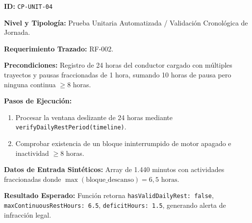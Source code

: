 \par\noindent\textbf{ID:} \texttt{C\allowbreak{}P\allowbreak{}-\allowbreak{}U\allowbreak{}N\allowbreak{}I\allowbreak{}T\allowbreak{}-\allowbreak{}0\allowbreak{}4\allowbreak{}}\par
\par\noindent\textbf{Nivel y Tipología:} Prueba Unitaria Automatizada / Validación Cronológica de Jornada.\par
\par\noindent\textbf{Requerimiento Trazado:} RF-002.\par
\par\noindent\textbf{Precondiciones:} Registro de 24 horas del conductor cargado con múltiples trayectos y pausas fraccionadas de 1 hora, sumando 10 horas de pausa pero ninguna continua \(\ge 8\) horas.\par
\par\noindent\textbf{Pasos de Ejecución:} \par
\begin{enumerate}
\item Procesar la ventana deslizante de 24 horas mediante \texttt{v\allowbreak{}e\allowbreak{}r\allowbreak{}i\allowbreak{}f\allowbreak{}y\allowbreak{}D\allowbreak{}a\allowbreak{}i\allowbreak{}l\allowbreak{}y\allowbreak{}R\allowbreak{}e\allowbreak{}s\allowbreak{}t\allowbreak{}P\allowbreak{}e\allowbreak{}r\allowbreak{}i\allowbreak{}o\allowbreak{}d\allowbreak{}(\allowbreak{}t\allowbreak{}i\allowbreak{}m\allowbreak{}e\allowbreak{}l\allowbreak{}i\allowbreak{}n\allowbreak{}e\allowbreak{})\allowbreak{}}.
\item Comprobar existencia de un bloque ininterrumpido de motor apagado e inactividad \(\ge 8\) horas.
\end{enumerate}
\par\noindent\textbf{Datos de Entrada Sintéticos:} Array de 1.440 minutos con actividades fraccionadas donde \(\max(\text{bloque\_descanso}) = 6{,}5\text{ horas}\).\par
\par\noindent\textbf{Resultado Esperado:} Función retorna \texttt{h\allowbreak{}a\allowbreak{}s\allowbreak{}V\allowbreak{}a\allowbreak{}l\allowbreak{}i\allowbreak{}d\allowbreak{}D\allowbreak{}a\allowbreak{}i\allowbreak{}l\allowbreak{}y\allowbreak{}R\allowbreak{}e\allowbreak{}s\allowbreak{}t\allowbreak{}:\allowbreak{} f\allowbreak{}a\allowbreak{}l\allowbreak{}s\allowbreak{}e\allowbreak{}}, \texttt{m\allowbreak{}a\allowbreak{}x\allowbreak{}C\allowbreak{}o\allowbreak{}n\allowbreak{}t\allowbreak{}i\allowbreak{}n\allowbreak{}u\allowbreak{}o\allowbreak{}u\allowbreak{}s\allowbreak{}R\allowbreak{}e\allowbreak{}s\allowbreak{}t\allowbreak{}H\allowbreak{}o\allowbreak{}u\allowbreak{}r\allowbreak{}s\allowbreak{}:\allowbreak{} 6\allowbreak{}.\allowbreak{}5\allowbreak{}}, \texttt{d\allowbreak{}e\allowbreak{}f\allowbreak{}i\allowbreak{}c\allowbreak{}i\allowbreak{}t\allowbreak{}H\allowbreak{}o\allowbreak{}u\allowbreak{}r\allowbreak{}s\allowbreak{}:\allowbreak{} 1\allowbreak{}.\allowbreak{}5\allowbreak{}}, generando alerta de infracción legal.\par
